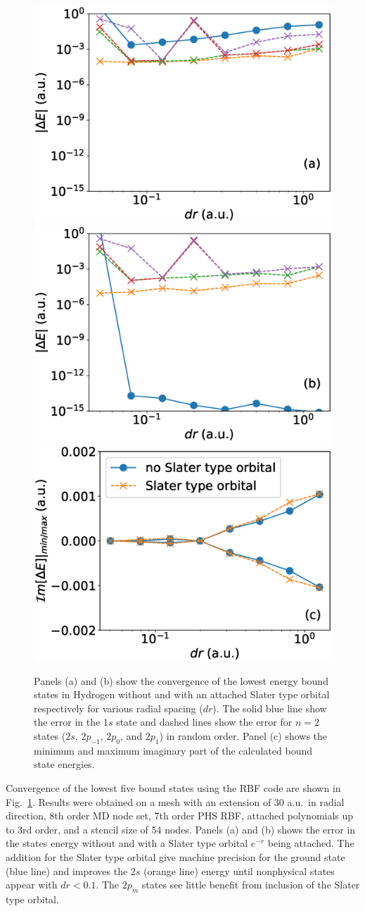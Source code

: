 \begin{figure}[t]
\centering
   \includegraphics[width=0.32\linewidth]{figs/rbf_no_exp.eps}
    \includegraphics[width=0.32\linewidth]{figs/rbf_with_exp.eps}
    \includegraphics[width=0.32\linewidth]{figs/rbf_imag.eps}
   
\caption{Panels (a) and (b) show the convergence of the lowest energy bound states in Hydrogen without and with an attached Slater type orbital respectively for various radial spacing ($dr$). The solid blue line show the error in the $1s$ state and dashed lines show the error for $n=2$ states ($2s$, $2p_{-1}$, $2p_{0}$, and $2p_{1}$) in random order. Panel (c) shows the minimum and maximum imaginary part of the calculated bound state energies.
} 
  \label{fig:rbf_conver}
\end{figure}

Convergence of the lowest five bound states using the RBF code are shown in Fig.~\ref{fig:rbf_conver}. Results were obtained on a mesh with an extension of 30 a.u.\ in radial direction, 8th order MD node set, 7th order PHS RBF, attached polynomials up to 3rd order, and a stencil size of 54 nodes. Panels (a) and (b) shows the error in the  states energy without and with a Slater type orbital $e^{-r}$ being attached. The addition for the Slater type orbital give machine precision for the ground state (blue line) and improves the $2s$ (orange line) energy until nonphysical states appear with $dr<0.1$. The $2p_m$ states see little benefit from inclusion of the Slater type orbital.

